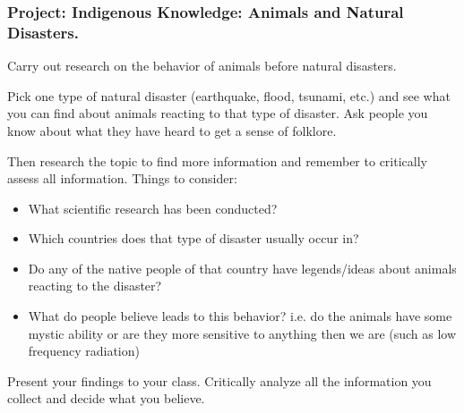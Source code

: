             \subsubsection{ Project: Indigenous Knowledge: Animals and Natural Disasters.}
            \nopagebreak
        \label{m38779*id1164119615164}Carry out research on the behavior of animals before natural disasters. \par 
        \label{m38779*id1164121934705}Pick one type of natural disaster (earthquake, flood, tsunami, etc.) and see what you can find about animals reacting to that type of disaster. Ask people you know about what they have heard to get a sense of folklore.\par 
        \label{m38779*id1164121037612}Then research the topic to find more information and remember to critically assess all information. Things to consider:\par 
        \label{m38779*id1164128014077}\begin{itemize}[noitemsep]
            \item What scientific research has been conducted? \item Which countries does that type of disaster usually occur in?\item Do any of the native people of that country have legends/ideas about animals reacting to the disaster? \item What do people believe leads to this behavior? i.e. do the animals have some mystic ability or are they more sensitive to anything then we are (such as low frequency radiation)\end{itemize}
        \label{m38779*id1164121076422}Present your findings to your class. Critically analyze all the information you collect and decide what you believe. \par 
      \label{m38779*cid9}
